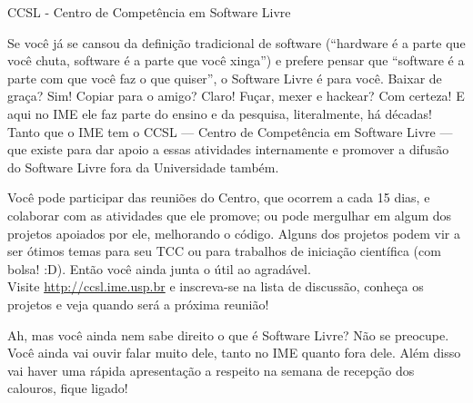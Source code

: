 \begin{secao}{CCSL - Centro de Competência em Software Livre}

Se você já se cansou da definição tradicional de software (``hardware é a parte
que você chuta, software é a parte que você xinga'') e prefere pensar que
``software é a parte com que você faz o que quiser'', o Software Livre é para você. 
Baixar de graça? Sim! Copiar para o amigo? Claro! Fuçar, mexer e hackear? Com
 certeza! E aqui no IME ele faz parte do ensino e da pesquisa, literalmente, há
 décadas! Tanto que o IME tem o CCSL --- Centro de Competência em Software Livre
 --- que existe para dar apoio a essas atividades internamente e promover a
 difusão do Software Livre fora da Universidade também.

Você pode participar das reuniões do Centro, que ocorrem a cada 15 dias, e
 colaborar com as atividades que ele promove; ou pode mergulhar em algum dos
 projetos apoiados por ele, melhorando o código. Alguns dos projetos podem vir a
 ser ótimos temas para seu TCC ou para trabalhos de iniciação científica (com
 bolsa! :D). Então você ainda junta o útil ao agradável.\\
Visite \url{http://ccsl.ime.usp.br} e inscreva-se na lista de discussão,
 conheça os projetos e veja quando será a próxima reunião!

Ah, mas você ainda nem sabe direito o que é Software Livre? Não se preocupe.
 Você ainda vai ouvir falar muito dele, tanto no IME quanto fora dele. Além disso vai
 haver uma rápida apresentação a respeito na semana de recepção dos calouros, fique ligado! %

\end{secao}
